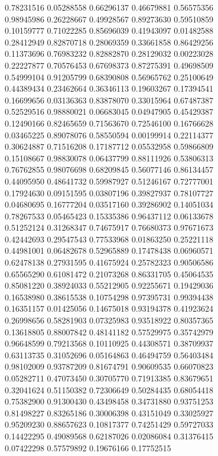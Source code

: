 \begin{figure}
   0.78231516   0.05288558
   0.66296137   0.46679881
   0.56575356   0.98945986
   0.26228667   0.49928567
   0.89273630   0.59510859
   0.10159777   0.71022285
   0.85696039   0.41943097
   0.01482588   0.28412949
   0.82870718   0.28069359
   0.33661858   0.86429256
   0.11373696   0.76983232
   0.82882870   0.28129032
   0.00223028   0.22227877
   0.70576453   0.67698373
   0.87275391   0.49698509
   0.54999104   0.91205799
   0.68390808   0.56965762
   0.25100649   0.44389434
   0.23462664   0.36346113
   0.19603267   0.17394541
   0.16699656   0.03136363
   0.83878070   0.33015964
   0.67487387   0.52529516
   0.98880021   0.06683045
   0.04947905   0.45429387
   0.12490166   0.82465659
   0.71563670   0.72546100
   0.16766628   0.03465225
   0.89078076   0.58550594
   0.00199914   0.22114377
   0.30624887   0.71516208
   0.17187712   0.05532958
   0.59866809   0.15108667
   0.98830078   0.06437799
   0.88111926   0.53806313
   0.76762855   0.98076698
   0.68209845   0.56077146
   0.86134457   0.44095950
   0.48641732   0.59987927
   0.51246167   0.72777001
   0.17924630   0.09151595
   0.03807196   0.39827937
   0.78107727   0.04680695
   0.16777204   0.03517160
   0.39286902   0.14051034
   0.78267533   0.05465423
   0.15335386   0.96437112
   0.06133678   0.51252124
   0.31268347   0.74675917
   0.76680373   0.97671673
   0.42442693   0.29547543
   0.77533968   0.01863250
   0.25221118   0.44981001
   0.06482678   0.52965889
   0.17478438   0.06960571
   0.62478138   0.27931595
   0.41675924   0.25782323
   0.90506586   0.65565290
   0.61081472   0.21073268
   0.86331705   0.45064535
   0.85081220   0.38924033
   0.55212905   0.92255671
   0.19429036   0.16538980
   0.38615538   0.10754298
   0.97395731   0.99394438
   0.16351157   0.01425056
   0.14675018   0.93194378
   0.41923624   0.26998656
   0.58281903   0.07325983
   0.93518922   0.80357365
   0.13618805   0.88007842
   0.48141182   0.57529975
   0.35742979   0.96648599
   0.79213568   0.10110925
   0.44308571   0.38709937
   0.63113735   0.31052696
   0.05164863   0.46494759
   0.56403484   0.98102009
   0.93787209   0.81674791
   0.90609535   0.66070823
   0.05282711   0.47073450
   0.30705770   0.71913385
   0.83679651   0.32041624
   0.51150382   0.72306649
   0.50284435   0.68054418
   0.75382900   0.91300430
   0.43498458   0.34731880
   0.93751253   0.81498227
   0.83265186   0.30006398
   0.43151049   0.33025927
   0.95209230   0.88657623
   0.10817377   0.74251429
   0.59727033   0.14422295
   0.49089568   0.62187026
   0.02086084   0.31376415
   0.07422298   0.57579892
   0.19676166   0.17752515

\end{figure}

